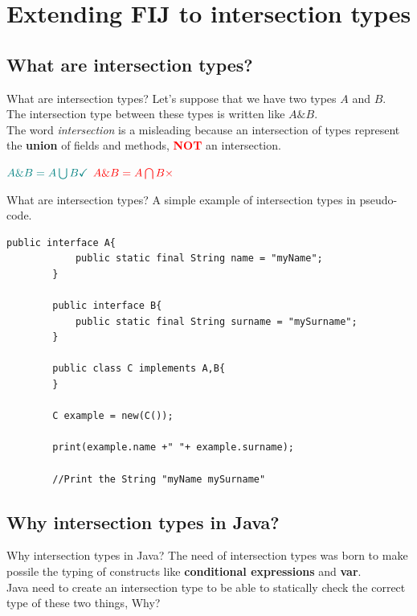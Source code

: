\documentclass{beamer}
\begin{document}
    \section{Extending FIJ to intersection types}
    
    \subsection{What are intersection types?}
   
    \begin{frame}{What are intersection types?}
    \boldmath
    Let's suppose that we have two types $A$ and $B$.\\
    The intersection type between these types is written like $A\&B$.\\
    The word \textit{intersection} is a misleading because an intersection of types represent the \textbf{union} of fields and methods, \textcolor{red}{\textbf{NOT}} an intersection.\\
    \begin{center}
    $\color{teal} A\&B = A \bigcup B \checkmark$ \hspace{1cm}
    $\color{red} A\&B = A \bigcap B \times$
    \end{center}
	\end{frame}

	\begin{frame}[fragile]{What are intersection types?}
	\boldmath
	A simple example of intersection types in pseudo-code.
	\begin{flushleft}
		\begin{lstlisting}[basicstyle=\scriptsize]
		public interface A{
			public static final String name = "myName";
		}
		
		public interface B{
			public static final String surname = "mySurname";
		}
		
		public class C implements A,B{
		}
		
	    C example = new(C());
	   
	    print(example.name +" "+ example.surname);
	    
	    //Print the String "myName mySurname"
		\end{lstlisting}
	\end{flushleft}
	\end{frame}

	\subsection{Why intersection types in Java?}
	\begin{frame}{Why intersection types in Java?}
	The need of intersection types was born to make possile the typing of constructs like \textbf{conditional expressions} and \textbf{var}.\\
	Java need to create an intersection type to be able to statically check the correct type of these two things, Why?
	\end{frame}
\end{document}
